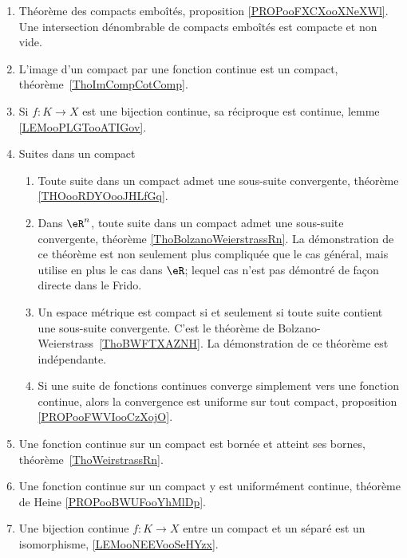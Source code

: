 \begin{description}
\begin{enumerate}
			\item
			      Théorème des compacts emboîtés, proposition \ref{PROPooFXCXooXNeXWl}. Une intersection dénombrable de compacts emboîtés est compacte et non vide.
			\item
			      L'image d'un compact par une fonction continue est un compact, théorème~\ref{ThoImCompCotComp}.
			\item
			      Si \( f\colon K\to X\) est une bijection continue, sa réciproque est continue, lemme \ref{LEMooPLGTooATIGov}.
			\item
			      Suites dans un compact
			      \begin{enumerate}
				      \item
				            Toute suite dans un compact admet une sous-suite convergente, théorème \ref{THOooRDYOooJHLfGq}.
				      \item
				            Dans \( \eR^n\), toute suite dans un compact admet une sous-suite convergente, théorème \ref{ThoBolzanoWeierstrassRn}. La démonstration de ce théorème est non seulement plus compliquée que le cas général, mais utilise en plus le cas dans \( \eR\); lequel cas n'est pas démontré de façon directe dans le Frido.
				      \item
				            Un espace métrique est compact si et seulement si toute suite contient une sous-suite convergente. C'est le théorème de Bolzano-Weierstrass~\ref{ThoBWFTXAZNH}. La démonstration de ce théorème est indépendante.
				      \item
				            Si une suite de fonctions continues converge simplement vers une fonction continue, alors la convergence est uniforme sur tout compact, proposition \ref{PROPooFWVIooCzXojO}.
			      \end{enumerate}
			\item
			      Une fonction continue sur un compact est bornée et atteint ses bornes, théorème~\ref{ThoWeirstrassRn}.
			\item
			      Une fonction continue sur un compact y est uniformément continue, théorème de Heine \ref{PROPooBWUFooYhMlDp}.
			\item
			      Une bijection continue \( f\colon K\to X\) entre un compact et un séparé est un isomorphisme, \ref{LEMooNEEVooSeHYzx}.
		\end{enumerate}


\end{description}
